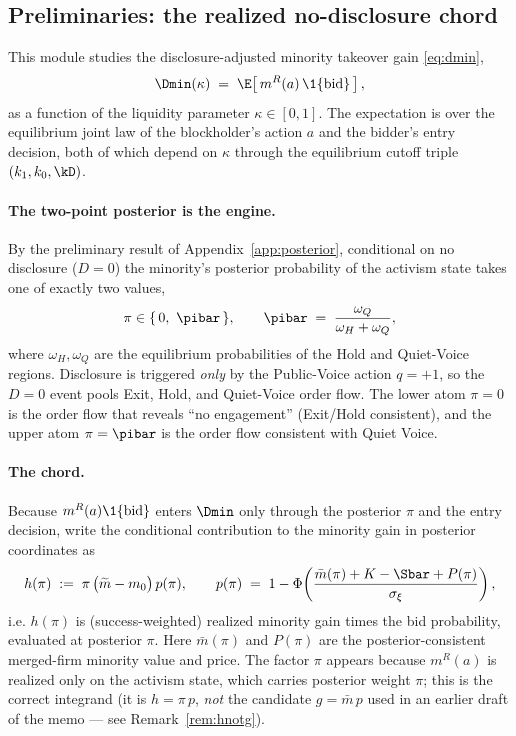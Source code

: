 \subsection{Preliminaries: the realized no-disclosure chord}
\label{app:chord}

This module studies the disclosure-adjusted minority takeover gain
\eqref{eq:dmin},
\[
  \Dmin(\kappa)
  \;=\;
  \E\!\left[\, m^{R}(a)\,\1\{\text{bid}\}\,\right],
\]
as a function of the liquidity parameter $\kappa\in[0,1]$. The expectation
is over the equilibrium joint law of the blockholder's action $a$ and the
bidder's entry decision, both of which depend on $\kappa$ through the
equilibrium cutoff triple $(k_1,k_0,\kD)$.

\paragraph{The two-point posterior is the engine.}
By the preliminary result of Appendix~\ref{app:posterior}, conditional on
no disclosure ($D=0$) the minority's posterior probability of the activism
state takes one of exactly two values,
\begin{equation}
  \label{eq:twopoint}
  \pi \in \{\,0,\ \pibar\,\},
  \qquad
  \pibar \;=\; \frac{\omega_Q}{\omega_H+\omega_Q},
\end{equation}
where $\omega_H,\omega_Q$ are the equilibrium probabilities of the Hold and
Quiet-Voice regions. Disclosure is triggered \emph{only} by the
Public-Voice action $q=+1$, so the $D=0$ event pools Exit, Hold, and
Quiet-Voice order flow. The lower atom $\pi=0$ is the order flow that
reveals ``no engagement'' (Exit/Hold consistent), and the upper atom
$\pi=\pibar$ is the order flow consistent with Quiet Voice.

\paragraph{The chord.}
Because $m^{R}(a)\1\{\text{bid}\}$ enters $\Dmin$ only through the posterior
$\pi$ and the entry decision, write the conditional contribution to the
minority gain in posterior coordinates as
\begin{equation}
  \label{eq:h}
  h(\pi) \;:=\; \pi\,\bigl(\widetilde m - m_0\bigr)\,p(\pi),
  \qquad
  p(\pi) \;=\; 1-\Phi\!\left(\frac{\bar m(\pi)+K-\Sbar+P(\pi)}{\sigma_\xi}\right),
\end{equation}
i.e. $h(\pi)$ is (success-weighted) realized minority gain times the bid
probability, evaluated at posterior $\pi$. Here $\bar m(\pi)$ and $P(\pi)$
are the posterior-consistent merged-firm minority value and price. The
factor $\pi$ appears because $m^{R}(a)$ is realized only on the activism
state, which carries posterior weight $\pi$; this is the correct integrand
(it is $h=\pi\,p$, \emph{not} the candidate $g=\bar m\,p$ used in an earlier
draft of the memo --- see Remark~\ref{rem:hnotg}).

